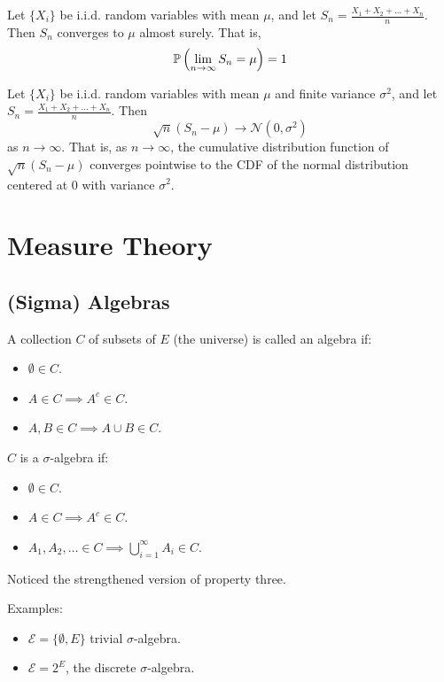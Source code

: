 \documentclass[english, course]{Notes}
\begin{document}
\begin{theorem}
Let $\{X_i\}$ be i.i.d. random variables with mean $\mu$, and let $S_n = \frac{X_1 + X_2 + \dots + X_n}{n}$. Then $S_n$ converges to $\mu$ almost surely. That is, 
\[\mathbb{P}\left(\lim_{n \to \infty} S_n = \mu\right) = 1\]
\end{theorem}

\begin{theorem}
Let $\{X_i\}$ be i.i.d. random variables with mean $\mu$ and finite variance $\sigma^2$, and let $S_n = \frac{X_1 + X_2 + \dots + X_n}{n}$. Then
\[\sqrt{n}(S_n - \mu) \to \mathcal{N}(0, \sigma^2)\]
as $n \to \infty$. That is, as $n \to \infty$, the cumulative distribution function of $\sqrt{n}(S_n - \mu)$ converges pointwise to the CDF of the normal distribution centered at $0$ with variance $\sigma^2$.
\end{theorem}

\section{Measure Theory}

\subsection{(Sigma) Algebras}

\begin{definition}
	A collection $C$ of subsets of $E$ (the universe) is called an algebra if:
	\begin{itemize}
		\item $\emptyset \in C$.
		\item $A \in C \implies A^c \in C$.
		\item $A, B \in C \implies A \cup B \in C$.
	\end{itemize}
	$C$ is a $\sigma$-algebra if:
	\begin{itemize}
		\item $\emptyset \in C$.
		\item $A \in C \implies A^c \in C$.
		\item $A_1, A_2, \dots \in C \implies \bigcup^\infty_{i = 1}A_i \in C$.
	\end{itemize}
	Noticed the strengthened version of property three.
\end{definition}

Examples:
\begin{itemize}
	\item $\mathcal{E} = \{\emptyset, E\}$ trivial $\sigma$-algebra.
	\item $\mathcal{E} = 2^E$, the discrete $\sigma$-algebra.
\end{itemize}
\end{document}
